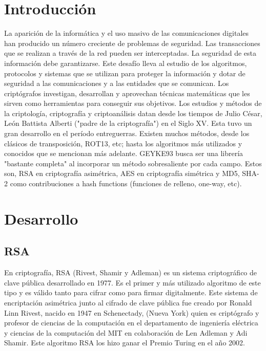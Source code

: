 \documentclass[spanish]{article}
\begin{document}
\section{Introducción}
La aparición de la informática y el uso masivo de las comunicaciones digitales han producido un número creciente de problemas de seguridad. Las transacciones que se realizan a través de la red pueden ser interceptadas. La seguridad de esta información debe garantizarse. Este desafío lleva al estudio de los algoritmos, protocolos y sistemas que se utilizan para proteger la información y dotar de seguridad a las comunicaciones y a las entidades que se comunican. Los criptógrafos investigan, desarrollan y aprovechan técnicas matemáticas que les sirven como herramientas para conseguir sus objetivos.
Los estudios y métodos de la criptología, criptografía y criptoanálisis datan desde los tiempos de Julio César, León Battista Alberti ("padre de la criptografía") en el Siglo XV. Esta tuvo un gran desarrollo en el período entreguerras.
Existen muchos métodos, desde los clásicos de transposición, ROT13, etc; hasta los algoritmos más utilizados y conocidos que se mencionan más adelante.
GEYKE93 busca ser una librería "bastante completa" al incorporar un método sobresaliente por cada campo. Estos son, RSA en criptografía asimétrica, AES en criptografía simétrica y MD5, SHA-2 como contribuciones a hash functions (funciones de relleno, one-way, etc).

\section{Desarrollo}
\subsection{RSA}
En criptografía, RSA (Rivest, Shamir y Adleman) es un sistema criptográfico de clave pública desarrollado en 1977. Es el primer y más utilizado algoritmo de este tipo y es válido tanto para cifrar como para firmar digitalmente.
Este sistema de encriptación asimétrica junto al cifrado de clave pública fue creado por Ronald Linn Rivest, nacido en 1947 en Schenectady, (Nueva York) quien es criptógrafo y profesor de ciencias de la computación en el departamento de ingenierí­a eléctrica y ciencias de la computación del MIT en colaboración de Len Adleman y Adi Shamir. Este algoritmo RSA los hizo ganar el Premio Turing en el año 2002.
\end{document}
